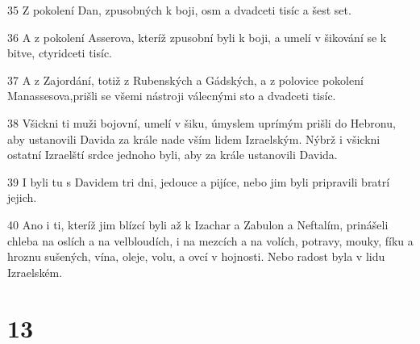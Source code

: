\par 35 Z pokolení Dan, zpusobných k boji, osm a dvadceti tisíc a šest set.
\par 36 A z pokolení Asserova, kteríž zpusobní byli k boji, a umelí v šikování se k bitve, ctyridceti tisíc.
\par 37 A z Zajordání, totiž z Rubenských a Gádských, a z polovice pokolení Manassesova,prišli se všemi nástroji válecnými sto a dvadceti tisíc.
\par 38 Všickni ti muži bojovní, umelí v šiku, úmyslem uprímým prišli do Hebronu, aby ustanovili Davida za krále nade vším lidem Izraelským. Nýbrž i všickni ostatní Izraelští srdce jednoho byli, aby za krále ustanovili Davida.
\par 39 I byli tu s Davidem tri dni, jedouce a pijíce, nebo jim byli pripravili bratrí jejich.
\par 40 Ano i ti, kteríž jim blízcí byli až k Izachar a Zabulon a Neftalím, prinášeli chleba na oslích a na velbloudích, i na mezcích a na volích, potravy, mouky, fíku a hroznu sušených, vína, oleje, volu, a ovcí v hojnosti. Nebo radost byla v lidu Izraelském.

\chapter{13}

